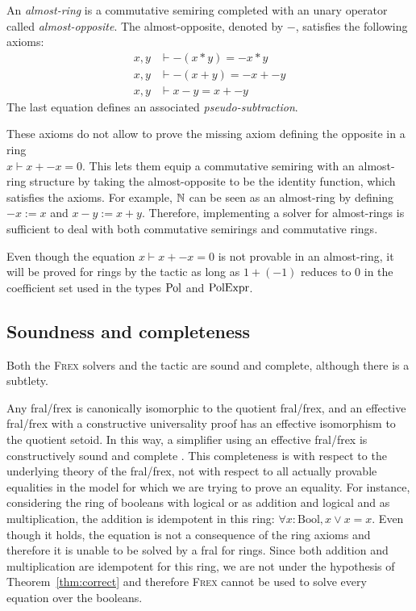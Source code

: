 An \emph{almost-ring} is a commutative semiring completed with an unary operator called \emph{almost-opposite}. The almost-opposite, denoted by $-$, satisfies the following axioms:
\begin{align*}
  x, y &\vdash -(x * y) = -x * y\\
  x, y &\vdash -(x + y) = -x + -y\\
  x, y &\vdash x - y = x + -y
\end{align*}
The last equation defines an associated \emph{pseudo-subtraction}.

These axioms do not allow to prove the missing axiom defining the opposite in a ring\\ $x \vdash x + -x = 0$. This lets them equip a commutative semiring with an almost-ring structure by taking the almost-opposite to be the identity function, which satisfies the axioms. For example, $\mathbb N$ can be seen as an almost-ring by defining $-x := x$ and $x - y := x + y$. Therefore, implementing a solver for almost-rings is sufficient to deal with both commutative semirings and commutative rings.

Even though the equation $x \vdash x + -x = 0$ is not provable in an almost-ring, it will be proved for rings by the \ring tactic as long as $1 + (-1)$ reduces to $0$ in the coefficient set used in the types $\mathrm{Pol}$ and $\mathrm{PolExpr}$.


\subsection{Soundness and completeness}
\label{sec:soundness-completeness}

Both the \textsc{Frex} solvers and the \ring tactic are sound and complete, although there is a subtlety.

Any fral/frex is canonically isomorphic to the quotient fral/frex, and an effective fral/frex with a constructive universality proof has an effective isomorphism to the quotient setoid. In this way, a simplifier using an effective fral/frex is constructively sound and complete \parencite{idris_frex}. This completeness is with respect to the underlying theory of the fral/frex, not with respect to all actually provable equalities in the model for which we are trying to prove an equality. For instance, considering the ring of booleans with logical or as addition and logical and as multiplication, the addition is idempotent in this ring: $\forall x : \textrm{Bool}, x \vee x = x$. Even though it holds, the equation is not a consequence of the ring axioms and therefore it is unable to be solved by a fral for rings. Since both addition and multiplication are idempotent for this ring, we are not under the hypothesis of Theorem~\ref{thm:correct} and therefore \textsc{Frex} cannot be used to solve every equation over the booleans.

